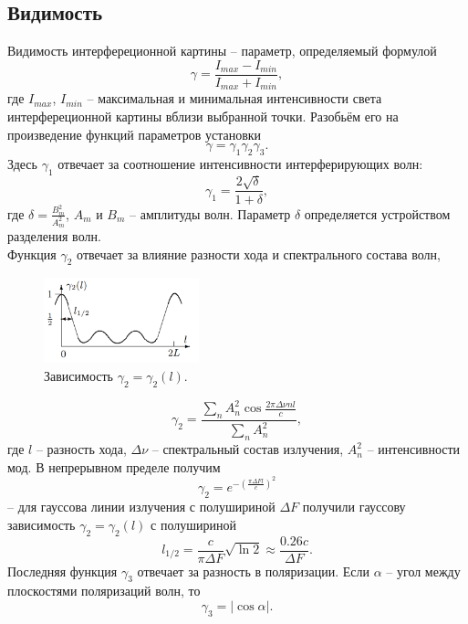 \documentclass[a4paper,12pt]{article}
\begin{document}
\subsection*{Видимость}
Видимость интерфереционной картины -- параметр, определяемый формулой
\begin{equation}
\gamma = \dfrac{I_{max} - I_{min}}{I_{max} + I_{min}},
\end{equation}
где $I_{max}$, $I_{min}$ -- максимальная и минимальная интенсивности света интерфереционной картины вблизи выбранной точки. Разобьём его на произведение функций параметров установки
$$
\gamma = \gamma_1 \gamma_2 \gamma_3.
$$
Здесь $\gamma_1$ отвечает за соотношение интенсивности интерферирующих волн:
\begin{equation}
\gamma_1 = \dfrac{2\sqrt{\delta}}{1+\delta},
\end{equation}
где $\delta = \frac{B_m^2}{A_m^2}$, $A_m$ и $B_m$ -- амплитуды волн. Параметр $\delta$ определяется устройством разделения волн.\\
Функция $\gamma_2$ отвечает за влияние разности хода и спектрального состава волн,
\begin{figure}
\begin{center}
\includegraphics[width = 0.4\textwidth]{1.png}
\vspace{-20pt}
\end{center}
\caption{Зависимость $\gamma_2 = \gamma_2(l)$.}
\end{figure}
$$
\gamma_2 = \dfrac{\sum\limits_n A^2_n \cos \frac{2\pi \Delta \nu n l}{c}}{\sum\limits_n A_n^2},
$$
где $l$ -- разность хода, $\Delta \nu$ -- спектральный состав излучения, $A_n^2$ -- интенсивности мод. В непрерывном пределе получим
$$
\gamma_2 = e^{-\left(\frac{\pi \Delta F l}{c}\right)^2}
$$
-- для гауссова линии излучения с полушириной $\Delta F$ получили гауссову зависимость $\gamma_2 = \gamma_2(l)$ с полушириной 
\begin{equation}
l_{1/2} = \dfrac{c}{\pi \Delta F}\sqrt{\ln 2} \approx \dfrac{0.26 c}{\Delta F}.
\end{equation}
Последняя функция $\gamma_3$ отвечает за разность в поляризации. Если $\alpha$ -- угол между плоскостями поляризаций волн, то
\begin{equation}
\gamma_3 = |\cos \alpha|.
\end{equation}
\end{document}
